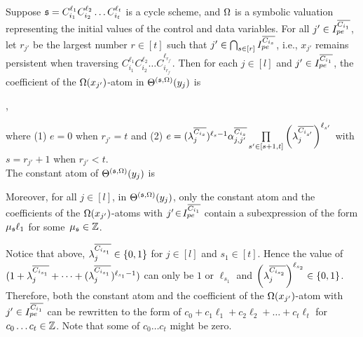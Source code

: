 \begin{lemma}\label{prop-cycle-schm}
Suppose ${\mathfrak{s} }=C_{i_1}^{\ell_1} C_{i_2}^{\ell_2} \dots C_{i_t}^{\ell_t}$ is a cycle scheme, and $\Omega$ is a symbolic valuation representing the initial values of the control and data variables. 
For all $j' \in  I^{\overline{C_{i_{1}}}}_{pe}$, let $r_{j'}$ be the largest number $r \in [t]$ such that $j'\in\bigcap_{s\in[r]} I^{\overline{C_{i_{s}}}}_{pe}$, i.e., $x_{j'}$ remains persistent when traversing $C_{i_1}^{\ell_1} C_{i_2}^{\ell_2} \dots C_{i_{r_{j'}}}^{\ell_{r_{j'}}}$.
Then for each $j\in [l]$ and $j' \in  I^{\overline{C_{i_{1}}}}_{pe}$, the coefficient of the $\Omega(x_{j'})$-atom in $\Theta^{({\mathfrak{s} },\Omega)}(y_j)$ is 
\begin{center}
,
\end{center}
where (1) $e\!=\!0$ when $r_{j'}\!=\!t$ and (2) $e=(\lambda^{\overline{C_{i_s}}}_{j})^{\ell_s-1} \alpha^{\overline{C_{i_{s}}}}_{j,j'} \prod\limits_{{s'}\in[s+1,t]}\left(\lambda^{\overline{C_{i_{s'}}}}_{j}\right)^{\ell_{s'}}$ with $s=r_{j'}+1$ when $r_{j'}<t$.\\
The constant atom of $\Theta^{({\mathfrak{s} },\Omega)}(y_j)$ is 
\begin{center}
\end{center}
Moreover, for all $j\!\in\! [l]$, in $\Theta^{({\mathfrak{s} },\Omega)}(y_j)$, only the constant atom and the coefficients of the $\Omega(x_{j'})$-atoms with $j' \!\in\!I^{\overline{C_{i_{1}}}}_{pe}$ contain a subexpression of the form $ \mu_{\mathfrak{s} } \ell_1$ for some~$\mu_{\mathfrak{s} }\in {\mathbb{Z} }$.
\end{lemma}
Notice that above, $\lambda^{\overline{C_{i_{s_1}}}}_j\in\{0,1\}$ for $j\in[l]$ and $s_1\in [t]$. Hence the value of $(1+\lambda^{\overline{C_{i_{s_1}}}}_{j} + \dots + (\lambda^{\overline{C_{i_{s_1}}}}_{j})^{\ell_{s_1}-1} )$ can only be $1$ or $\ell_{s_1}$ and $\left(\lambda^{\overline{C_{i_{s_2}}}}_{j}\right)^{\ell_{s_2}}\in\{0,1\}$.
Therefore, both the constant atom and the coefficient of the $\Omega(x_{j'})$-atom with $j'\in I^{\overline{C_{i_{1}}}}_{pe}$ can be rewritten to the form of $c_0+c_1\ell_1+c_2\ell_2+\dots+c_t\ell_t$ for $c_0\ldots c_t\in {\mathbb{Z} }$. Note that some of $c_0\ldots c_t$ might be zero.




